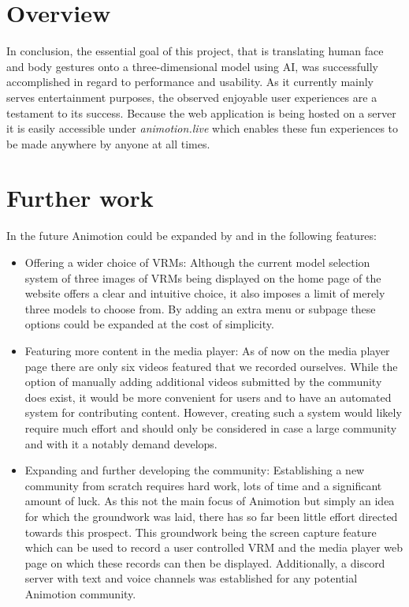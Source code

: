 \section{Overview}
In conclusion, the essential goal of this project, that is translating human face and body gestures onto 
a three-dimensional model using AI, was successfully accomplished in regard to performance and usability. 
As it currently mainly serves entertainment purposes, the observed enjoyable user experiences are a testament
to its success. Because the web application is being hosted on a server it is easily accessible under
\emph{animotion.live} which enables these fun experiences to be made anywhere by anyone at all times.

\section{Further work}
In the future Animotion could be expanded by and in the following features:
\begin{itemize}
    \item Offering a wider choice of VRMs: Although the current model selection system of three images of VRMs
    being displayed on the home page of the website offers a clear and intuitive choice, it also imposes a limit
    of merely three models to choose from. By adding an extra menu or subpage these options could be expanded at
    the cost of simplicity.
    \item Featuring more content in the media player: As of now on the media player page there are only six videos 
    featured that we recorded ourselves. While the option of manually adding additional videos submitted by the 
    community does exist, it would be more convenient for users and to have an automated system for contributing content. 
    However, creating such a system would likely require much effort and should only be considered in case a large 
    community and with it a notably demand develops.
    \item Expanding and further developing the community: Establishing a new community from scratch requires hard work,
    lots of time and a significant amount of luck. As this not the main focus of Animotion but simply an idea for which
    the groundwork was laid, there has so far been little effort directed towards this prospect. This groundwork being
    the screen capture feature which can be used to record a user controlled VRM and the media player web page on which
    these records can then be displayed. Additionally, a discord server with text and voice channels was established for
    any potential Animotion community.
\end{itemize}

